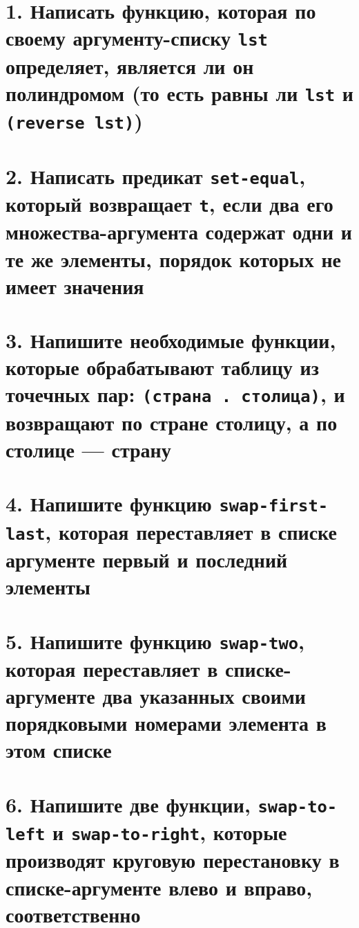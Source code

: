 \section*{1. Написать функцию, которая по своему аргументу-списку \texttt{lst} определяет, является ли он полиндромом (то есть равны ли \texttt{lst} и \texttt{(reverse lst)})}




\section*{2. Написать предикат \texttt{set-equal}, который возвращает \texttt{t}, если два его множества-аргумента содержат одни и те же элементы, порядок которых не имеет значения}



\section*{3. Напишите необходимые функции, которые обрабатывают таблицу из точечных пар: \texttt{(страна . столица)}, и возвращают по стране столицу, а по столице --- страну}




\section*{4. Напишите функцию \texttt{swap-first-last}, которая переставляет в списке аргументе первый и последний элементы}




\section*{5. Напишите функцию \texttt{swap-two}, которая переставляет в списке-аргументе два указанных своими порядковыми номерами элемента в этом списке}




\section*{6. Напишите две функции, \texttt{swap-to-left} и \texttt{swap-to-right}, которые производят круговую перестановку в списке-аргументе влево и вправо, соответственно}

